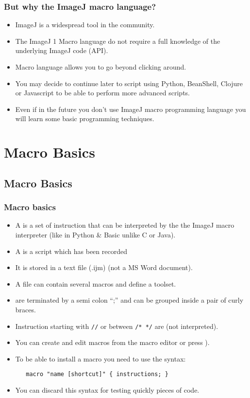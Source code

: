 \begin{frame}
  \frametitle{But why the ImageJ macro language?}
  \begin{itemize}
    \item ImageJ is a widespread tool in the community.
    \item The ImageJ 1 Macro language do not require a full knowledge of the
    underlying ImageJ code (API).
    \item Macro language allows you to go beyond clicking around.
    \item You may decide to continue later to script using Python,
    BeanShell, Clojure or Javascript to be able to perform more
    advanced scripts.
    \item Even if in the future you don't use ImageJ macro programming
    language you will learn some basic programming techniques.
  \end{itemize}
\end{frame}

\section{Macro Basics}
\subsection{Macro Basics}
\begin{frame}[fragile]
  \frametitle<presentation>{Macro basics}
  \begin{itemize}
    \item A  is a set of instruction that can be interpreted
    by the the ImageJ macro interpreter (like in Python \& Basic unlike
    C or Java).
    \item A  is a script which has been recorded
    \item It is stored in a text file (.ijm) (not a MS Word document).
    \item A file can contain several macros and define a toolset.
    \item {} are terminated by a semi colon ``;'' and can
      be grouped inside a pair of curly braces.
    \item Instruction starting with \verb$//$ or between \verb$/* */$
      are  (not interpreted).
    \item You can create and edit macros from the macro editor
       or press \keys{[}).
    \item To be able to install a macro you need to use the syntax:
      \begin{minipage}{5cm}
        \verb$   macro "name [shortcut]" { instructions; } $
      \end{minipage}
    \item You can discard this syntax for testing quickly pieces of code.
\end{itemize}
\end{frame}

